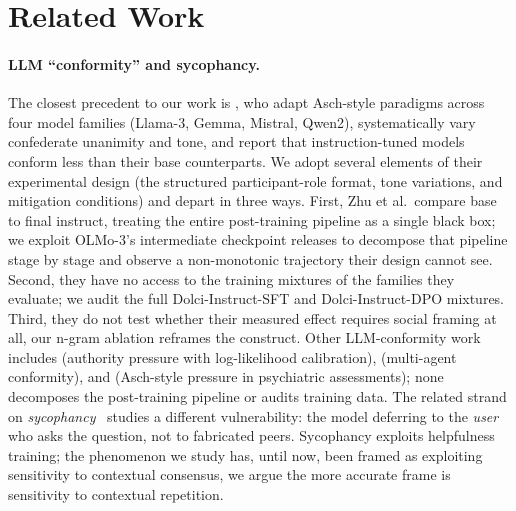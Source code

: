 \documentclass{article}
\begin{document}
\section{Related Work}
\label{sec:related}

\paragraph{LLM ``conformity'' and sycophancy.}
The closest precedent to our work is \citet{zhu2025conformity}, who adapt Asch-style paradigms across four model families (Llama-3, Gemma, Mistral, Qwen2), systematically vary confederate unanimity and tone, and report that instruction-tuned models conform less than their base counterparts. We adopt several elements of their experimental design (the structured participant-role format, tone variations, and mitigation conditions) and depart in three ways. First, Zhu et al.\ compare base to final instruct, treating the entire post-training pipeline as a single black box; we exploit OLMo-3's intermediate checkpoint releases to decompose that pipeline stage by stage and observe a non-monotonic trajectory their design cannot see. Second, they have no access to the training mixtures of the families they evaluate; we audit the full Dolci-Instruct-SFT and Dolci-Instruct-DPO mixtures. Third, they do not test whether their measured effect requires social framing at all, our n-gram ablation reframes the construct. Other LLM-conformity work includes \citet{celebi2025parrot} (authority pressure with log-likelihood calibration), \citet{weng2025benchform} (multi-agent conformity), and \citet{shoval2025psychiatric} (Asch-style pressure in psychiatric assessments); none decomposes the post-training pipeline or audits training data. The related strand on \emph{sycophancy}~\citep{sharma2024sycophancy, elephant2025, hong2025syconbench} studies a different vulnerability: the model deferring to the \emph{user} who asks the question, not to fabricated peers. Sycophancy exploits helpfulness training; the phenomenon we study has, until now, been framed as exploiting sensitivity to contextual consensus, we argue the more accurate frame is sensitivity to contextual repetition.
\end{document}
